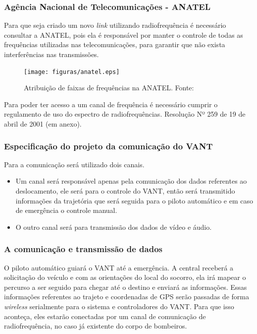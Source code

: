 \subsubsection{Agência Nacional de Telecomunicações - ANATEL}

Para que seja criado um novo \textit{link} utilizando radiofrequência é necessário consultar a ANATEL, pois ela é responsável por 
manter o controle de todas as frequências utilizadas nas telecomunicações, para garantir que não exista interferências nas transmissões.

\begin{figure}[H]
	\centering
	  \texttt{[image: figuras/anatel.eps]}
	\caption{Atribuição de faixas de frequências na ANATEL. Fonte: \cite{anatel}}
	\label{fig:tabela}
\end{figure}


Para poder ter acesso a um canal de frequência é necessário cumprir o regulamento de uso do espectro de radiofrequências. 
Resolução Nº 259 de 19 de abril de 2001 (em anexo).

\subsubsection{Especificação do projeto da comunicação do VANT}

Para a comunicação será utilizado dois canais.

\begin{itemize}
	\item Um canal será responsável apenas pela comunicação dos dados referentes ao deslocamento, ele será para o controle do VANT, então será transmitido informações da trajetória que será seguida para o piloto automático e em caso de emergência o controle manual.
	\item O outro canal será para transmissão dos dados de vídeo e áudio.
\end{itemize}

\subsubsection{A comunicação e transmissão de dados }

O piloto automático guiará o VANT até a emergência. A central receberá a solicitação do veículo e com as orientações do local do 
socorro, ela irá mapear o percurso a ser seguido para chegar até o destino e enviará as informações.  
Essas informações referentes ao trajeto e coordenadas de 
GPS serão passadas de forma \textit{wireless} serialmente para o sistema e controladores do VANT. Para que isso aconteça, eles estarão conectadas 
por um canal de comunicação de radiofrequência, no caso já existente do corpo de bombeiros.

